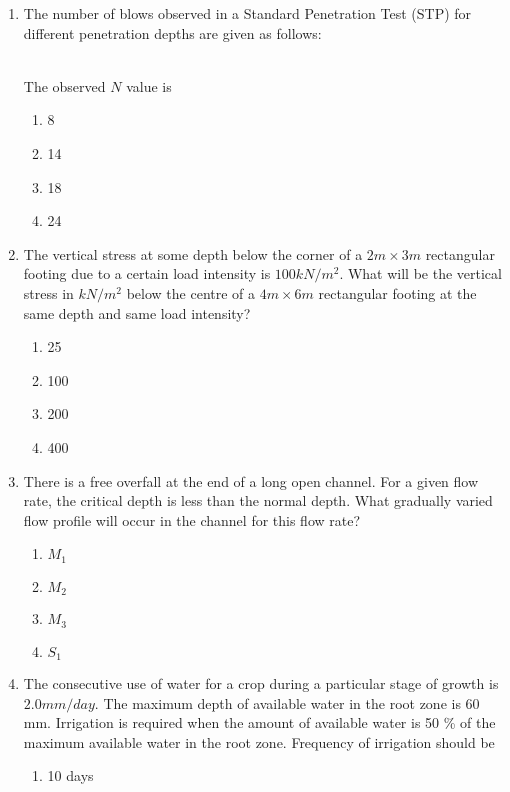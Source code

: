\documentclass[journal]{IEEEtran}
\begin{document}
\begin{enumerate}
\begin{enumerate}
		\end{enumerate}
	\item
	The number of blows observed in a Standard Penetration Test (STP) for different penetration depths are given as follows: \\
	\begin{table}[h!]    	
    		\centering
    		 
       \end{table}
	\\
	The observed $N$ value is
		\begin{enumerate}
			\item 8
			\item 14
			\item 18
			\item 24
		\end{enumerate}
	\item
	The vertical stress at some depth below the corner of a $2m \times 3m$ rectangular footing due to a certain load intensity is $100 kN/m^2$. What will be the vertical stress in $kN/m^2$ below the centre of a $4m \times 6m$ rectangular footing at the same depth and same load intensity?
		\begin{enumerate}
			\item 25
			\item 100
			\item 200
			\item 400
		\end{enumerate}
	\item
	There is a free overfall at the end of a long open channel. For a given flow rate, the critical depth is less than the normal depth. What gradually varied flow profile will occur in the channel for this flow rate?
		\begin{enumerate}
			\item $M_1$
			\item $M_2$
			\item $M_3$
			\item $S_1$
		\end{enumerate}
	\item
	The consecutive use of water for a crop during a particular stage of growth is $2.0 mm/day$. The maximum depth of available water in the root zone is 60 mm. Irrigation is required when the amount of available water is 50 \% of the maximum available water in the root zone. Frequency of irrigation should be
		\begin{enumerate}
			\item 10 days

\end{enumerate}
\end{enumerate}
\end{document}
